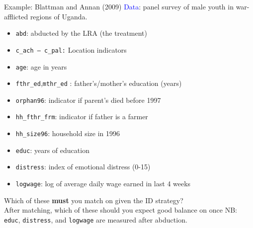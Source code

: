 \documentclass[xcolor=dvipsnames]{beamer}
\begin{document}
\begin{frame}{Example: Blattman and Annan (2009)}
\small
{} \textcolor{Blue}{Data}: panel survey of male youth in war-afflicted regions of Uganda. \\
\footnotesize
\begin{itemize}
\item \texttt{abd}: abducted by the LRA (the treatment)
\item \texttt{c\_ach -- c\_pal:} Location indicators
\item \texttt{age}: age in years
\item \texttt{fthr\_ed},\texttt{mthr\_ed} : father's/mother's education (years)
\item \texttt{orphan96}: indicator if parent's died before 1997
\item \texttt{hh\_fthr\_frm}: indicator if father is a farmer
\item \texttt{hh\_size96}: household size in 1996
\item \texttt{educ}: years of education
\item \texttt{distress}: index of emotional distress (0-15)
\item \texttt{logwage}: log of average daily wage earned in last 4 weeks
\end{itemize}
\small
\medskip
{} Which of these  \textbf{must} you match on given the ID strategy? \\
\smallskip
{} After matching, which of these should you expect good balance on once  \footnotesize \alert{NB:} \texttt{educ}, \texttt{distress}, and \texttt{logwage} are measured after abduction.\\
\end{frame}
\end{document}
